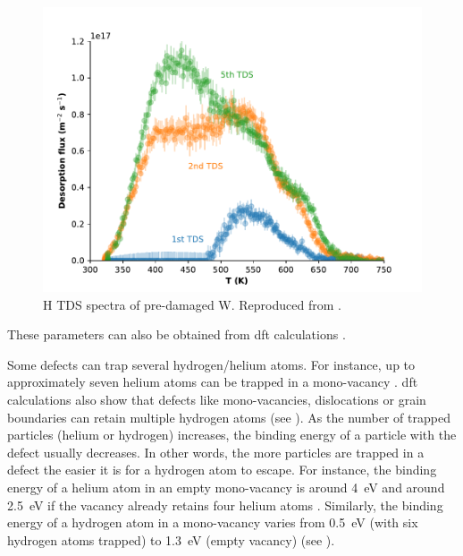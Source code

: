 \begin{figure} [h!]
    \centering
    \includegraphics[width=\linewidth]{Figures/Chapter1/tds_helium_nicolas.pdf}
    \caption{H TDS spectra of pre-damaged W. Reproduced from \cite{ialovega_hydrogen_2020}.}
\end{figure}

These parameters can also be obtained from \gls{dft} calculations .

Some defects can trap several hydrogen/helium atoms.
For instance, up to approximately seven helium atoms can be trapped in a mono-\gls{vacancy} .
\gls{dft} calculations also show that defects like mono-vacancies, dislocations or grain boundaries can retain multiple hydrogen atoms (see ).
As the number of trapped particles (helium or hydrogen) increases, the binding energy of a particle with the defect usually decreases.
In other words, the more particles are trapped in a defect the easier it is for a hydrogen atom to escape.
For instance, the binding energy of a helium atom in an empty mono-\gls{vacancy} is around \SI{4}{eV} and around \SI{2.5}{eV} if the \gls{vacancy} already retains four helium atoms \cite{faney_spatially_2015}.
Similarly, the binding energy of a hydrogen atom in a mono-\gls{vacancy} varies from \SI{0.5}{eV} (with six hydrogen atoms trapped) to \SI{1.3}{eV} (empty \gls{vacancy}) (see ).


